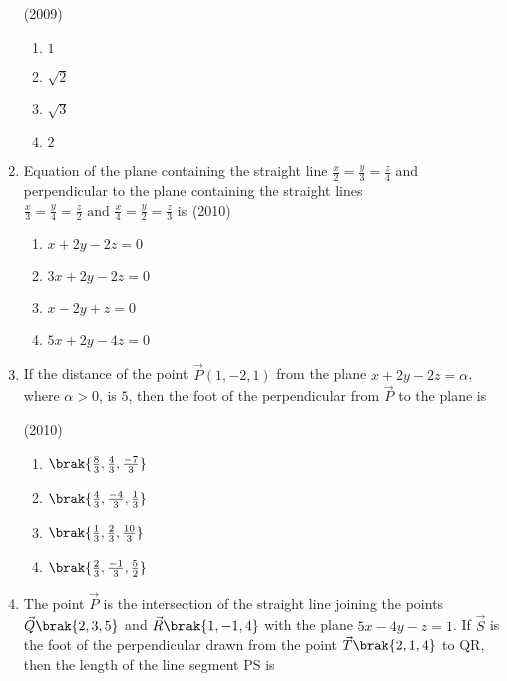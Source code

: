 \begin{enumerate}[label=\thesubsection.\arabic*.,ref=\thesubsection.\theenumi]
    \hfill{(2009)}
    \begin{multicols}{4}
    	\begin{enumerate}
    		\item $1$
    		\item $\sqrt{2}$
    		\item $\sqrt{3}$
    		\item $2$
    	\end{enumerate}
    \end{multicols}
    \item Equation of the plane containing the straight line $\frac{x}{2}=\frac{y}{3}=\frac{z}{4}$ and perpendicular to the plane containing the straight lines $\frac{x}{3}=\frac{y}{4}=\frac{z}{2} \text{ and } \frac{x}{4}=\frac{y}{2}=\frac{z}{3}$ is 
    \hfill{(2010)}
\begin{multicols}{2}
    \begin{enumerate}
    	\item $x+2y-2z=0$
    	\item $3x+2y-2z=0$
    	\item $x-2y+z=0$
    	\item $5x+2y-4z=0$
    \end{enumerate}
\end{multicols}
    \item If the distance of the point $\vec{P}(1,-2,1)$ from the plane $x+2y-2z=\alpha$, where $\alpha>0$, is $5$, then the foot of the perpendicular from $\vec{P}$ to the plane is
\begin{multicols}{4}
    \hfill{(2010)}
    \begin{enumerate}
    	\item $\brak{\frac{8}{3}, \frac{4}{3}, \frac{-7}{3}}$
    	\item $\brak{\frac{4}{3}, \frac{-4}{3}, \frac{1}{3}}$
    	\item $\brak{\frac{1}{3}, \frac{2}{3}, \frac{10}{3}}$
    	\item $\brak{\frac{2}{3}, \frac{-1}{3}, \frac{5}{2}}$
    \end{enumerate}
\end{multicols}
	 \item %
		 The point $\vec{P}$ is the intersection of the straight line joining the points $\vec{Q}\brak{2,3,5}$ and $\vec{R}\brak{1,-1,4}$ with the plane $5x-4y-z=1$. If $\vec{S}$ is the foot of the perpendicular drawn from the point $\vec{T}\brak{2,1,4}$ to QR, then the length of the line segment PS is \hfill{}
\begin{multicols}{4}

\end{multicols}
\end{enumerate}
